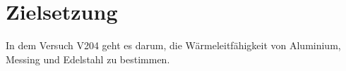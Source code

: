\section{Zielsetzung} 

\begin{flushleft}
    In dem Versuch V204 geht es darum, die Wärmeleitfähigkeit von Aluminium, Messing und Edelstahl zu bestimmen.
\end{flushleft}
